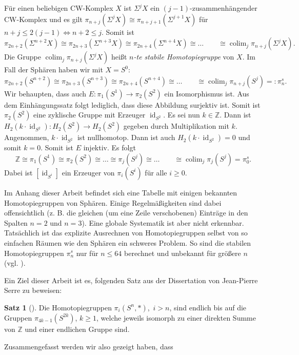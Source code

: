 \documentclass[11pt, a4paper, german]{article}
\theoremstyle{definition}
\newtheorem{satz}[lem]{Satz}
\theoremstyle{remark}
\newcommand{\Z}{\mathbb{Z}} %
\DeclareMathOperator{\id}{id} %
\DeclareMathOperator{\colim}{colim} %
\begin{document}
Für einen beliebigen CW-Komplex $X$ ist $\Sigma^j X$ ein $(j{-}1)$-zusammenhängender CW-Komplex und es gilt $\pi_{n+j}(\Sigma^j X) \cong \pi_{n+j+1}(\Sigma^{j+1} X)$ für $n + j \leq 2(j-1) \Leftrightarrow n+2 \leq j$.
Somit ist
\[ \pi_{2n+2}(\Sigma^{n+2} X) \cong \pi_{2n+3}(\Sigma^{n+3} X) \cong \pi_{2n+4}(\Sigma^{n+4} X) \cong \ldots \qquad \cong \colim_j \pi_{n+j}(\Sigma^j X). \]
Die Gruppe $\colim_j \pi_{n+j}(\Sigma^j X)$ heißt \emph{$n$-te stabile Homotopiegruppe} von $X$.
Im Fall der Sphären haben wir mit $X = S^0$:
\[ \pi_{2n+2}(S^{n+2}) \cong \pi_{2n+3}(S^{n+3}) \cong \pi_{2n+4}(S^{n+4}) \cong \ldots \qquad \cong \colim_j \pi_{n+j}(S^j) =: \pi^s_n. \]
Wir behaupten, dass auch $E : \pi_1(S^1) \to \pi_2(S^2)$ ein Isomorphismus ist.
Aus dem Einhängungssatz folgt lediglich, dass diese Abbildung surjektiv ist.
Somit ist $\pi_2(S^2)$ eine zyklische Gruppe mit Erzeuger $\id_{S^2}$.
Es sei nun $k \in \Z$.
Dann ist $H_2(k \cdot \id_{S^2}) : H_2(S^2) \to H_2(S^2)$ gegeben durch Multiplikation mit $k$.
Angenommen, $k \cdot \id_{S^2}$ ist nullhomotop.
Dann ist auch $H_2(k \cdot \id_{S^2}) = 0$ und somit $k = 0$.
Somit ist $E$ injektiv.
Es folgt
\[ \Z \cong \pi_1(S^1) \cong \pi_2(S^2) \cong \ldots \cong \pi_j(S^j)  \cong \ldots \qquad \cong \colim_j \pi_j(S^j) = \pi^s_0. \]
Dabei ist $[\id_{S^i}]$ ein Erzeuger von $\pi_i(S^i)$ für alle $i \geq 0$.

Im Anhang dieser Arbeit befindet sich eine Tabelle mit einigen bekannten Homotopiegruppen von Sphären.
Einige Regelmäßigkeiten sind dabei offensichtlich (z. B. die gleichen (um eine Zeile verschobenen) Einträge in den Spalten $n{=}2$ und $n{=}3$).
Eine globale Systematik ist aber nicht erkennbar.
Tatsächlich ist das explizite Ausrechnen von Homotopiegruppen selbst von so einfachen Räumen wie den Sphären ein schweres Problem.
So sind die stabilen Homotopiegruppen $\pi_n^s$ nur für $n \leq 64$ berechnet und unbekannt für größere $n$ (vgl. \cite[384]{hatcher:at}).

Ein Ziel dieser Arbeit ist es, folgenden Satz aus der Dissertation von Jean-Pierre Serre zu beweisen:

\begin{satz}[\cite{serre:thesis}]\label{serre-finiteness}
  Die Homotopiegruppen $\pi_i(S^n, *)$,~$i > n$, sind endlich bis auf die Gruppen $\pi_{4k-1}(S^{2k})$, $k \geq 1$, welche jeweils isomorph zu einer direkten Summe von $\Z$ und einer endlichen Gruppe sind.
\end{satz}

Zusammengefasst werden wir also gezeigt haben, dass
\end{document}
